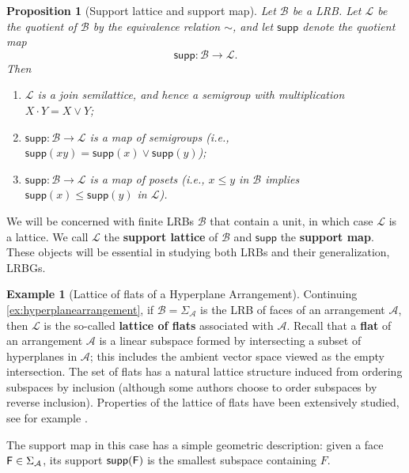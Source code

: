\documentclass[11pt, oneside, reqno]{amsart}
\newtheorem{prop}[theorem]{Proposition}
\theoremstyle{definition}
\newtheorem{example}[theorem]{Example}
\numberwithin{equation}{section}
\newcommand{\defn}[1]{{\color{RoyalBlue}\bf#1}}
\def \A{{\mathcal{A}}}
\def \BB{{\mathcal{B}}}
\def \lat{{\mathcal{L}}}
\def \supp{\mathsf{supp}}
\begin{document}
\begin{prop}[Support lattice and support map]\label{def:supportmap}
    Let $\BB$ be a LRB.
    Let $\lat$ be the quotient of $\BB$ by the equivalence relation $\sim$,
    and let $\supp$ denote the quotient map
    \[ \supp: \BB \longrightarrow  \lat. \]
    Then
    \begin{enumerate}
        \item
            $\lat$ is a join semilattice, and hence a semigroup with multiplication
            $X \cdot Y = X \vee Y$;

        \item\label{item-semigroup-map}
            $\supp: \BB \to \lat$ is a map of semigroups
            (i.e., $\supp(xy) = \supp(x) \vee \supp(y)$);

        \item\label{item-poset-map}
            $\supp: \BB \xrightarrow{} \lat$ is a map of posets
            (i.e., $x \leq y$ in $\BB$ implies $\supp(x) \leq \supp(y)$ in $\lat$).
    \end{enumerate}
\end{prop}
We will be concerned with finite LRBs $\BB$ that contain a unit, in which case $\lat$ is a lattice.
We call $\lat$ the \defn{support lattice} of $\BB$ and $\supp$ the \defn{support map}.
These objects will be essential in studying both LRBs and their generalization, LRBGs.

\begin{example}[Lattice of flats of a Hyperplane Arrangement]\label{ex:latticeflats}
    Continuing \cref{ex:hyperplanearrangement}, if $\BB = \Sigma_{\A}$ is
    the LRB of faces of an arrangement $\A$, then $\lat$ is the so-called
    \defn{lattice of flats} associated with $\A$. Recall that a \defn{flat} of an
    arrangement $\A$ is a linear subspace formed by intersecting a subset of
    hyperplanes in $\A$; this includes the ambient vector space viewed as the
    empty intersection. The set of flats has a natural lattice structure
    induced from ordering subspaces by inclusion (although some authors choose
    to order subspaces by reverse inclusion). Properties of the lattice of
    flats have been extensively studied, see for example \cite{am17}.

    The support map in this case has a simple geometric description: given
    a face ${\sf F} \in \Sigma_{\A}$, its support $\supp({\sf F})$ is the
    smallest subspace containing $F$.
\end{example}
\end{document}
